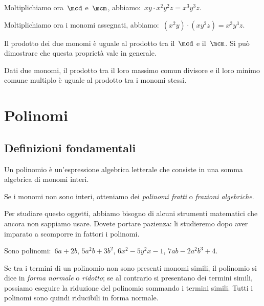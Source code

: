 Moltiplichiamo ora~\(\mcd\) e~\(\mcm\), abbiamo:~\(xy\cdot x^{2}y^{2}z= 
x^{3}y^{3}z.\)

Moltiplichiamo ora i monomi assegnati, abbiamo:~\((x^{2}y)\cdot 
(xy^{2}z)=x^{3}y^{3}z.\)

Il prodotto dei due monomi è uguale al prodotto tra il~\(\mcd\) e
il~\(\mcm\). Si può dimostrare che questa proprietà vale in generale.

\begin{proprieta}
 Dati due monomi, il prodotto tra il loro massimo comun
divisore e il loro minimo comune multiplo è uguale al prodotto tra i
monomi stessi.
\end{proprieta}


\section{Polinomi}

\subsection{Definizioni fondamentali}
\label{subsec:10_poli_definizioni}

\begin{definizione}
Un polinomio è un'espressione algebrica letterale che consiste in una somma 
algebrica di monomi interi.
\end{definizione}

\begin{osservazione}
Se i monomi non sono interi, otteniamo dei \emph{polinomi fratti} o 
\emph{frazioni algebriche}.

Per studiare questo oggetti, abbiamo bisogno di alcuni strumenti matematici 
che ancora non sappiamo usare. 
Dovete portare pazienza: li studieremo dopo aver imparato a scomporre in 
fattori i polinomi.
\end{osservazione}


\begin{exrig}
\begin{esempio}
Sono polinomi:~\(6a+2b\), \(5a^2b+3b^2\), \(6x^2-5y^2x-1\), \(7ab-2a^2b^3+4\).
\end{esempio}
\end{exrig}

Se tra i termini di un polinomio non sono presenti monomi simili, il 
polinomio si dice in \emph{forma normale} o
\emph{ridotto}; se al contrario si presentano dei termini simili, possiamo 
eseguire la riduzione del polinomio
sommando i termini simili. Tutti i polinomi sono quindi riducibili in forma 
normale.

